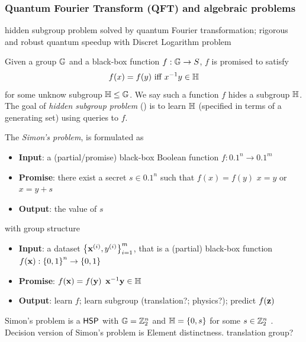 \subsubsection{Quantum Fourier Transform (QFT) and algebraic problems}
hidden subgroup problem solved by quantum Fourier transformation\cite{childsQuantumAlgorithmsAlgebraic2010};
rigorous and robust quantum speedup with Discret Logarithm problem \cite{liuRigorousRobustQuantum2021} \cite{glickCovariantQuantumKernels2021}
\begin{problem}\label{prm:hidden_subgroup}
	Given a group $\mathbb{G}$ and a black-box function $f:\mathbb{G}\to S$, 
	$f$ is promised to satisfy 
	\begin{equation}
		f(x) =f(y) \text{ iff } x^{-1}y \in \mathbb{H} 
	\end{equation}
	for some unknow subgroup $\mathbb{H} \le \mathbb{G}$.
	We say such a function $f$ hides a subgroup $\mathbb{H}$.
	The goal of \emph{hidden subgroup problem} (\hsp) is to learn $\mathbb{H}$
	(specified in terms of a generating set) using queries to $f$.
\end{problem}
\begin{problem}
	The \emph{Simon's problem}, is formulated as 
	\begin{itemize}
		\item \textbf{Input}: a (partial/promise) black-box Boolean function $f:\qty{0,1}^n \to \qty{0,1}^m$ 
		\item \textbf{Promise}: there exist a secret $s\in \qty{0,1}^n $ such that $f(x)=f(y)$ \iff $x=y$ or $x=y+s$
		\item \textbf{Output}: the value of $s$
	\end{itemize}
\end{problem}
\begin{problem}
	with group structure
	\begin{itemize}
		\item \textbf{Input}: a dataset $\qty{\vb{x}^{(i)},y^{(i)}}_{i=1}^m$,
		that is a (partial) black-box function $f(\vb{x}):\qty{0,1}^n \to \qty{0,1}$
		\item \textbf{Promise}: $f(\vb{x})=f(\vb{y})$ \iff $\vb{x}^{-1}\vb{y}\in \mathbb{H}$
		\item \textbf{Output}: learn $f$; learn subgroup (translation?; physics?); predict $f(\vb{z})$
	\end{itemize}
\end{problem}
\begin{remark}
	Simon's problem \cite{simonPowerQuantumComputation1997}
	is a $\textsf{HSP}$ with $\mathbb{G} = \mathbb{Z}^n_2$ and $\mathbb{H} = \qty{ 0, s }$ for some $s \in \mathbb{Z}_2^n$ .
	Decision version of Simon's problem is Element distinctness.
	translation group?
\end{remark}
